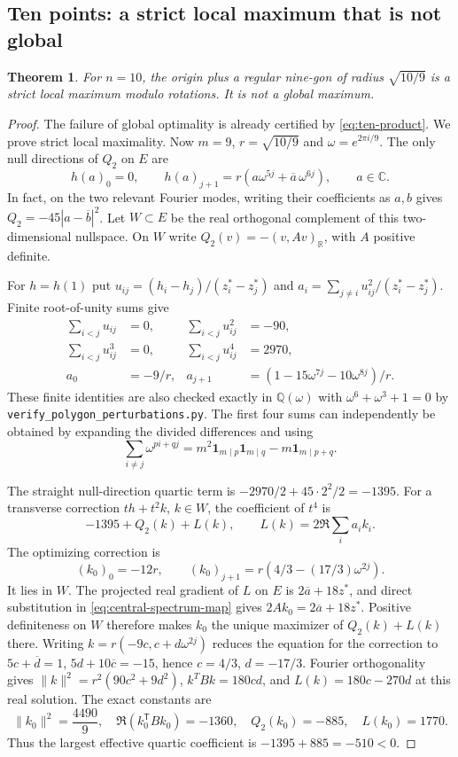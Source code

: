 \documentclass[11pt]{article}
\newtheorem{theorem}{Theorem}[section]
\theoremstyle{remark}
\newcommand{\C}{\mathbb C}
\newcommand{\R}{\mathbb R}
\newcommand{\Q}{\mathbb Q}
\numberwithin{equation}{section}
\begin{document}
\subsection{Ten points: a strict local maximum that is not global}
\begin{theorem}\label{thm:ten-local-trap}
For $n=10$, the origin plus a regular nine-gon of radius $\sqrt{10/9}$
is a strict local maximum modulo rotations. It is not a global maximum.
\end{theorem}
\begin{proof}
The failure of global optimality is already certified by
\eqref{eq:ten-product}. We prove strict local maximality.
Now $m=9$, $r=\sqrt{10/9}$ and $\omega=e^{2\pi i/9}$.
The only null directions of $Q_2$ on $E$ are
\[
 h(a)_0=0,\qquad
 h(a)_{j+1}=r(a\omega^{5j}+\overline a\,\omega^{6j}),
 \qquad a\in\C.
\]
In fact, on the two relevant Fourier modes, writing their
coefficients as $a,b$ gives $Q_2=-45|a-\overline b|^2$.
Let $W\subset E$ be the real orthogonal complement of this
two-dimensional nullspace. On $W$ write
$Q_2(v)=-(v,Av)_{\R}$, with $A$ positive definite.

For $h=h(1)$ put
$u_{ij}=(h_i-h_j)/(z_i^*-z_j^*)$ and
$a_i=\sum_{j\ne i}u_{ij}^2/(z_i^*-z_j^*)$.
Finite root-of-unity sums give
\begin{align*}
 \sum_{i<j}u_{ij}&=0,&\sum_{i<j}u_{ij}^2&=-90,\\
 \sum_{i<j}u_{ij}^3&=0,&\sum_{i<j}u_{ij}^4&=2970,\\
 a_0&=-9/r,&
 a_{j+1}&=(1-15\omega^{7j}-10\omega^{8j})/r.
\end{align*}
These finite identities are also checked exactly in
$\Q(\omega)$ with $\omega^6+\omega^3+1=0$ by
\texttt{verify\_polygon\_\allowbreak perturbations.py}.
The first four sums can independently be obtained by expanding the
divided differences and using
\[
 \sum_{i\ne j}\omega^{pi+qj}
 =m^2\mathbf1_{m\mid p}\mathbf1_{m\mid q}
       -m\mathbf1_{m\mid p+q}.
\]

The straight null-direction quartic term is
$-2970/2+45\cdot2^2/2=-1395$.
For a transverse correction $th+t^2k$, $k\in W$, the coefficient
of $t^4$ is
\begin{equation}\label{eq:ten-effective-quartic}
 -1395+Q_2(k)+L(k),\qquad
 L(k)=2\Re\sum_i a_i k_i.
\end{equation}
The optimizing correction is
\[
 (k_0)_0=-12r,\qquad
 (k_0)_{j+1}=r(4/3-(17/3)\omega^{2j}).
\]
It lies in $W$. The projected real gradient of $L$ on $E$ is
$2\overline a+18z^*$, and direct substitution in
\eqref{eq:central-spectrum-map} gives
$2Ak_0=2\overline a+18z^*$.
Positive definiteness on $W$ therefore makes $k_0$ the unique maximizer
of $Q_2(k)+L(k)$ there. Writing $k=r(-9c,c+d\omega^{2j})$ reduces the equation for the
correction to $5c+\overline d=1$, $5d+10\overline c=-15$, hence
$c=4/3$, $d=-17/3$. Fourier orthogonality gives
$\|k\|^2=r^2(90c^2+9d^2)$,
$k^TBk=180cd$, and $L(k)=180c-270d$ at this real solution.
The exact constants are
\[
 \|k_0\|^2=\frac{4490}{9},\quad
 \Re(k_0^{\mathsf T}Bk_0)=-1360,\quad
 Q_2(k_0)=-885,\quad L(k_0)=1770.
\]
Thus the largest effective quartic coefficient is
$-1395+885=-510<0$.


\end{proof}
\end{document}
